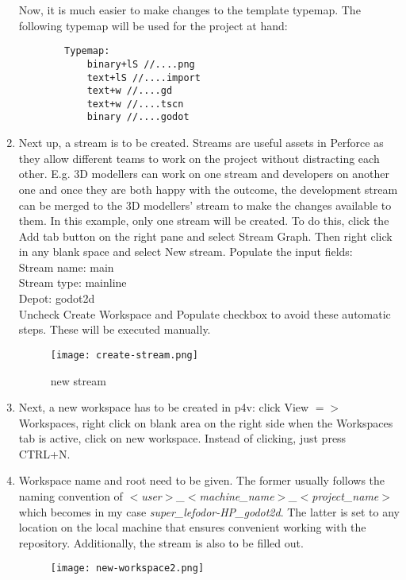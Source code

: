 \begin{enumerate}
\begin{verbatim}
    \end{verbatim}
    Now, it is much easier to make changes to the template typemap.
    The following typemap will be used for the project at hand:
    \begin{verbatim}
        Typemap:
            binary+lS //....png
            text+lS //....import
            text+w //....gd
            text+w //....tscn
            binary //....godot
    \end{verbatim}
    \item Next up, a stream is to be created. Streams are useful assets in Perforce as they allow different
    teams to work on the project without distracting each other. E.g. 3D modellers can work on one stream and developers 
    on another one and once they are both happy with the outcome, the development stream can be merged to the 3D modellers'
    stream to make the changes available to them. In this example, only one stream will be created.
    To do this, click the Add tab button on the right pane and select Stream Graph. Then right click in any blank space
    and select New stream. Populate the input fields: \\
    Stream name: main \\
    Stream type: mainline \\
    Depot: godot2d \\
    Uncheck Create Workspace and Populate checkbox to avoid these automatic steps. These will be executed manually.
    \begin{figure}[H]
        \centering
        \texttt{[image: create-stream.png]}
        \caption{new stream}
        \label{fig:new-stream}
    \end{figure}
    \item Next, a new workspace has to be created in p4v: click View {$=>$} Workspaces, right click on blank area on the
    right side when the Workspaces tab is active, click on new workspace. Instead of clicking, just press CTRL+N.
    \item Workspace name and root need to be given. The former usually follows the naming convention of 
    \textit{$<$user$>$\_$<$machine\_name$>$\_$<$project\_name$>$} which becomes in my case 
    \textit{super\_lefodor-HP\_godot2d}. The latter is set to any location on the local machine that ensures convenient
    working with the repository. Additionally, the stream is also to be filled out.
    \begin{figure}[H]
        \centering
        \texttt{[image: new-workspace2.png]}

\end{figure}
\end{enumerate}
